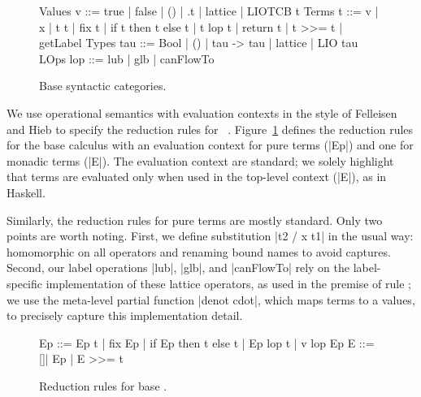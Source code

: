 \begin{figure}
\small
\centering
\begin{code}
Values  v    ::=  true | false | () | \x.t | lattice | LIOTCB t
Terms   t    ::=  v | x | t t | fix t | if t then t else t
               |  t lop t | return t | t >>= t | getLabel
Types   tau  ::=  Bool | () | tau -> tau | lattice | LIO tau  
LOps    lop  ::=  lub | glb | canFlowTo
\end{code}
\caption{Base \lio{} syntactic categories.
\label{fig:sos:base}}
\end{figure}

We use operational semantics with evaluation contexts in the style of Felleisen
and Hieb to specify the reduction rules for \lio~\cite{felleisen1992revised}.
%
Figure~\ref{fig:sos:base} defines the reduction rules for the base
calculus with an evaluation context for pure
terms (|Ep|) and one for monadic terms (|E|).
%
The evaluation context are standard; we solely highlight that terms
are evaluated only when used in the top-level context (|E|), as in
Haskell.

Similarly, the reduction rules for pure terms are mostly standard.
%
Only two points are worth noting.
%
First, we define substitution |{t2 / x } t1| in the usual way:
homomorphic on all operators and renaming bound names to avoid
captures. 
%
Second, our label operations |lub|, |glb|, and |canFlowTo| rely on the
label-specific implementation of these lattice operators, as used in
the premise of rule ;
%
we use the meta-level partial function |denot cdot|, which maps terms
to a values, to precisely capture this implementation detail.

\begin{figure}[t] %
\small
\begin{code}
Ep  ::= Ep t | fix Ep | if Ep then t else t | Ep lop t | v lop Ep
E   ::= []| Ep | E >>= t 
\end{code}

\caption{Reduction rules for base \lio.\label{lio:sos:base}}
\end{figure}

